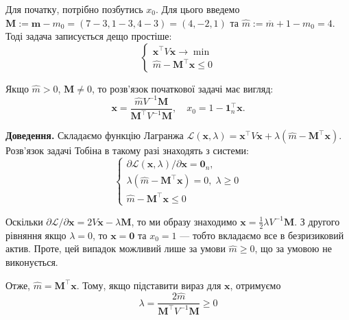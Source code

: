 \documentclass{test_template}
\begin{document}
Для початку, потрібно позбутись $x_0$. Для цього введемо $\mathbf{M} :=
\mathbf{m}-m_0 = (7-3,1-3,4-3)=(4,-2,1)$ та $\hat{m} := \overline{m} + 1 - m_0 =
4$. Тоді задача записується дещо простіше:
\begin{equation*}
    \begin{cases}
        \mathbf{x}^{\top}V\mathbf{x} \to \min \\
        \hat{m} - \mathbf{M}^{\top}\mathbf{x} \leq 0
    \end{cases}
\end{equation*}

\begin{theorem}
    Якщо $\hat{m}>0$, $\mathbf{M} \neq 0$, то розв'язок початкової задачі має вигляд:
    \begin{equation*}
        \mathbf{x} = \frac{\hat{m}V^{-1}\mathbf{M}}{\mathbf{M}^{\top}V^{-1}\mathbf{M}}, \quad x_0 = 1 - \mathbf{1}_n^{\top}\mathbf{x}.
    \end{equation*}
\end{theorem}

\textbf{Доведення.} Складаємо функцію Лагранжа
$\mathcal{L}(\mathbf{x},\lambda)=\mathbf{x}^{\top}V\mathbf{x} + \lambda(\hat{m}
- \mathbf{M}^{\top}\mathbf{x})$. Розв'язок задачі Тобіна в такому разі 
знаходять з системи:
\begin{equation*}
    \begin{cases}
        \partial \mathcal{L}(\mathbf{x},\lambda)/\partial\mathbf{x} = \mathbf{0}_n, \\
        \lambda(\hat{m} - \mathbf{M}^{\top}\mathbf{x}) = 0, \; \lambda \geq 0 \\
        \hat{m} - \mathbf{M}^{\top}\mathbf{x} \leq 0
    \end{cases}
\end{equation*}

Оскільки $\partial\mathcal{L}/\partial\mathbf{x} = 2V\mathbf{x} -
\lambda\mathbf{M}$, то ми образу знаходимо $\mathbf{x} = \frac{1}{2}\lambda
V^{-1}\mathbf{M}$. З другого рівняння якщо $\lambda=0$, то $\mathbf{x} =
\mathbf{0}$ та $x_0=1$ --- тобто вкладаємо все в безризиковий актив. Проте, цей
випадок можливий лише за умови $\hat{m} \geq 0$, що за умовою не виконується.

Отже, $\hat{m} = \mathbf{M}^{\top}\mathbf{x}$. Тому, якщо підставити вираз 
для $\mathbf{x}$, отримуємо
\begin{equation*}
    \lambda = \frac{2\hat{m}}{\mathbf{M}^{\top}V^{-1}\mathbf{M}} \geq 0
\end{equation*}
\end{document}
